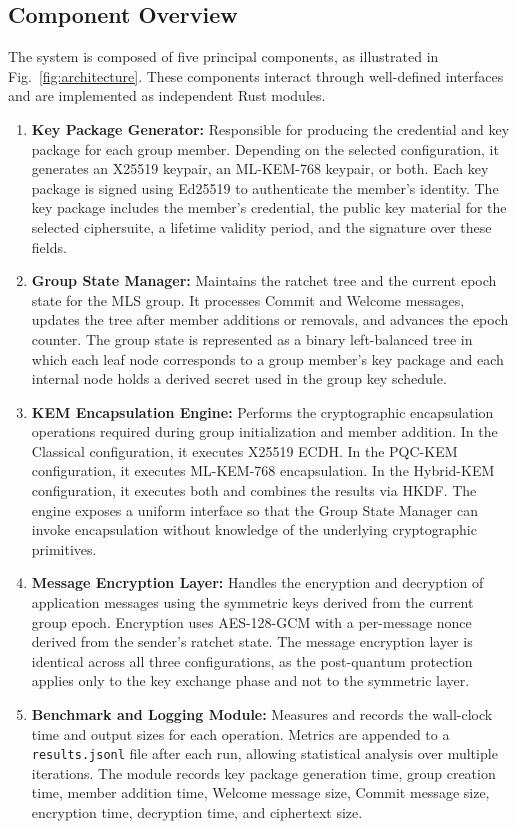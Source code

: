 \documentclass{ieeeaccess}
\begin{document}
\subsection{Component Overview}

The system is composed of five principal components, as illustrated in
Fig.~\ref{fig:architecture}. These components interact through well-defined
interfaces and are implemented as independent Rust modules.

\begin{enumerate}
  \item \textbf{Key Package Generator:} Responsible for producing the credential
  and key package for each group member. Depending on the selected configuration,
  it generates an X25519 keypair, an ML-KEM-768 keypair, or both. Each key package
  is signed using Ed25519 to authenticate the member's identity. The key package
  includes the member's credential, the public key material for the selected
  ciphersuite, a lifetime validity period, and the signature over these fields.

  \item \textbf{Group State Manager:} Maintains the ratchet tree and the current
  epoch state for the MLS group. It processes Commit and Welcome messages, updates
  the tree after member additions or removals, and advances the epoch counter. The
  group state is represented as a binary left-balanced tree in which each leaf node
  corresponds to a group member's key package and each internal node holds a derived
  secret used in the group key schedule.

  \item \textbf{KEM Encapsulation Engine:} Performs the cryptographic encapsulation
  operations required during group initialization and member addition. In the
  Classical configuration, it executes X25519 ECDH. In the PQC-KEM configuration,
  it executes ML-KEM-768 encapsulation. In the Hybrid-KEM configuration, it
  executes both and combines the results via HKDF. The engine exposes a uniform
  interface so that the Group State Manager can invoke encapsulation without
  knowledge of the underlying cryptographic primitives.

  \item \textbf{Message Encryption Layer:} Handles the encryption and decryption
  of application messages using the symmetric keys derived from the current group
  epoch. Encryption uses AES-128-GCM with a per-message nonce derived from the
  sender's ratchet state. The message encryption layer is identical across all
  three configurations, as the post-quantum protection applies only to the key
  exchange phase and not to the symmetric layer.

  \item \textbf{Benchmark and Logging Module:} Measures and records the wall-clock
  time and output sizes for each operation. Metrics are appended to a
  \texttt{results.jsonl} file after each run, allowing statistical analysis over
  multiple iterations. The module records key package generation time, group
  creation time, member addition time, Welcome message size, Commit message size,
  encryption time, decryption time, and ciphertext size.
\end{enumerate}
\end{document}
